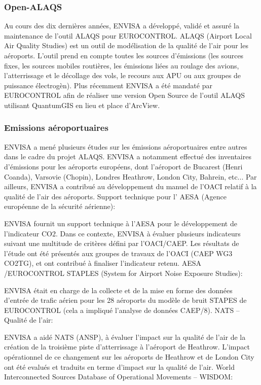 \documentclass[a4paper,12pt,twoside]{article}
\begin{document}
    \subsubsection*{Open-ALAQS}
    Au cours des dix dernières années, ENVISA a développé, validé et assuré la maintenance de l'outil ALAQS pour EUROCONTROL. ALAQS (Airport Local Air Quality Studies) est un outil de modélisation de la qualité de l'air pour les aéroports. L'outil prend en compte toutes les sources d'émissions (les sources fixes, les sources mobiles routières, les émissions liées au roulage des avions, l'atterrissage et le décollage des vols, le recours aux APU ou aux groupes de puissance électrogèn). Plus récemment ENVISA a été mandaté par EUROCONTROL afin de réaliser une version Open Source de l'outil ALAQS utilisant QuantumGIS en lieu et place d’ArcView.
    
    \subsubsection*{Emissions aéroportuaires}
    ENVISA a mené plusieurs études sur les émissions aéroportuaires entre autres dans le cadre du projet ALAQS. ENVISA a notamment effectué des inventaires d'émissions pour les aéroports européens, dont  l'aéroport de Bucarest (Henri Coanda), Varsovie (Chopin), Londres Heathrow, London City, Bahrein, etc...
    Par ailleurs, ENVISA a contribué au développement du manuel de l'OACI relatif à la qualité de l'air des aéroports.
    Support technique pour l' AESA (Agence européenne de la sécurité aérienne):
    
    ENVISA fournit un support technique à l'AESA pour le développement de l'indicateur CO2. Dans ce contexte, ENVISA à évaluer plusieurs indicateurs suivant une multitude de critères défini par l'OACI/CAEP. Les résultats de l'étude ont été présentés aux groupes de travaux de l'OACI (CAEP WG3 CO2TG), et ont contribué à finaliser l'indicateur retenu.
    AESA /EUROCONTROL STAPLES (System for Airport Noise Exposure Studies):
    
    ENVISA était en charge de la collecte et de la mise en forme des données d'entrée de trafic aérien pour les 28 aéroports du modèle de bruit STAPES de EUROCONTROL (cela a impliqué l'analyse de données CAEP/8).
    NATS – Qualité de l'air:
    
    ENVISA a aidé NATS (ANSP), à évaluer l'impact sur la qualité de l'air de la création de la troisième piste d'atterrissage à l'aéroport de Heathrow. L'impact opérationnel de ce changement sur les aéroports de Heathrow et de London City ont été evalués et traduits en terme d'impact sur la qualité de l'air.
    World Interconnected Sources Database of Operational Movements – WISDOM:
    
\end{document}
